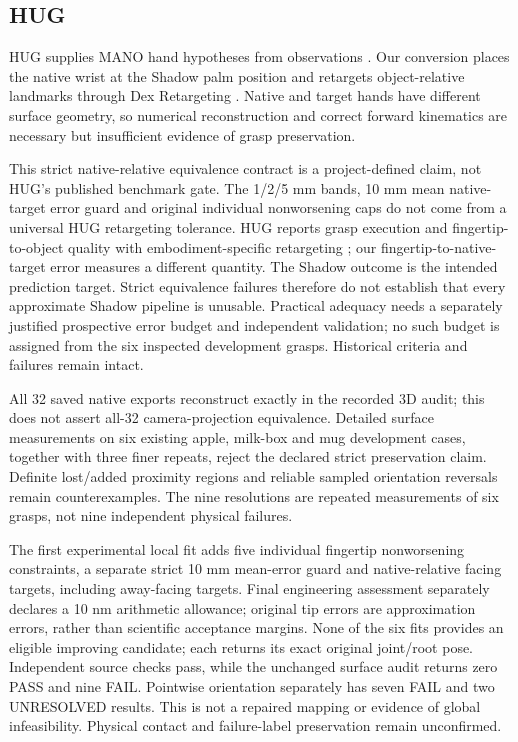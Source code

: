 \documentclass[10pt,letterpaper]{article}
\begin{document}
\subsection{HUG}
HUG supplies MANO hand hypotheses from observations \cite{hug}. Our conversion
places the native wrist at the Shadow palm position and retargets object-relative
landmarks through Dex Retargeting \cite{dex}. Native and target hands have
different surface geometry, so numerical reconstruction and correct forward
kinematics are necessary but insufficient evidence of grasp preservation.

This strict native-relative equivalence contract is a project-defined claim,
not HUG's published benchmark gate. The 1/2/5 mm bands, 10 mm mean
native-target error guard and original individual nonworsening caps do not
come from a universal HUG retargeting tolerance. HUG reports grasp execution
and fingertip-to-object quality with embodiment-specific retargeting
\cite{hug}; our fingertip-to-native-target error measures a different quantity.
The Shadow outcome is the intended prediction target. Strict equivalence
failures therefore do not establish that every approximate Shadow pipeline is
unusable. Practical adequacy needs a separately justified prospective error
budget and independent validation; no such budget is assigned from the six
inspected development grasps. Historical criteria and failures remain intact.

All 32 saved native exports reconstruct exactly in the recorded 3D audit;
this does not assert all-32 camera-projection equivalence. Detailed surface
measurements on six existing apple, milk-box and mug development cases, together
with three finer repeats, reject the declared strict preservation claim.
Definite lost/added proximity regions and reliable sampled orientation reversals
remain counterexamples. The nine resolutions are repeated measurements of six
grasps, not nine independent physical failures.

The first experimental local fit adds five individual fingertip nonworsening
constraints, a separate strict 10 mm mean-error guard and native-relative facing
targets, including away-facing targets. Final engineering assessment separately
declares a 10 nm arithmetic allowance; original tip errors are approximation
errors, rather than scientific acceptance margins. None of the six fits provides
an eligible improving candidate; each returns its exact original joint/root pose.
Independent source checks pass, while the unchanged surface audit returns zero
PASS and nine FAIL. Pointwise orientation separately has seven FAIL and two
UNRESOLVED results. This is not a repaired mapping or evidence of global
infeasibility. Physical contact and failure-label preservation remain unconfirmed.
\end{document}
